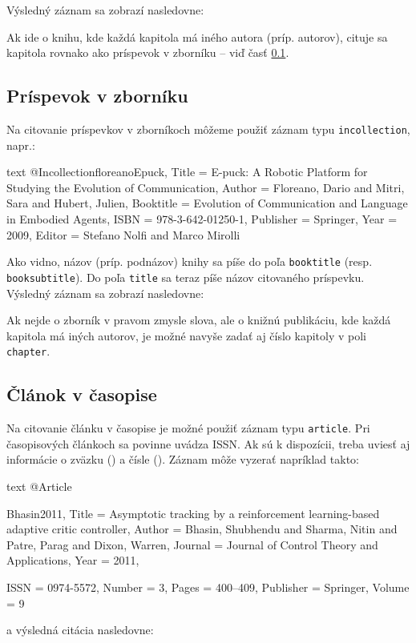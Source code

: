 Výsledný záznam sa zobrazí nasledovne:

\noindent[X] 

Ak ide o knihu, kde každá kapitola má iného autora (príp. autorov), cituje sa kapitola rovnako ako príspevok v zborníku -- viď časť \ref{sec:inproc}.

\subsection{Príspevok v zborníku}
\label{sec:inproc}

Na citovanie príspevkov v zborníkoch môžeme použiť záznam typu \texttt{incollection}, napr.:
\begin{inlinecode}{text}
@Incollection{floreanoEpuck,
  Title                    = {E-puck: A Robotic Platform for Studying the Evolution of Communication},
  Author                   = {Floreano, Dario and Mitri, Sara and Hubert, Julien},
  Booktitle                = {Evolution of Communication and Language in Embodied Agents},
  ISBN                     = {978-3-642-01250-1},
  Publisher                = {Springer},
  Year                     = {2009},
  Editor                   = {Stefano Nolfi and Marco Mirolli}
}
\end{inlinecode}

Ako vidno, názov (príp. podnázov) knihy sa píše do poľa \texttt{booktitle} (resp. \texttt{booksubtitle}). Do poľa \texttt{title} sa teraz píše názov citovaného príspevku. Výsledný záznam sa zobrazí nasledovne:

\noindent[X] 

Ak nejde o zborník v pravom zmysle slova, ale o knižnú publikáciu, kde každá kapitola má iných autorov, je možné navyše zadať aj číslo kapitoly v poli \texttt{chapter}.

\subsection{Článok v časopise}

Na citovanie článku v časopise je možné použiť záznam typu \texttt{article}. Pri časopisových článkoch sa povinne uvádza ISSN. Ak sú k dispozícii, treba uviesť aj informácie o zväzku () a čísle (). Záznam môže vyzerať napríklad takto:
\begin{inlinecode}{text}
@Article{Bhasin2011,
  Title                    = {Asymptotic tracking by a reinforcement learning-based adaptive critic controller},
  Author                   = {Bhasin, Shubhendu and Sharma, Nitin and Patre, Parag and Dixon, Warren},
  Journal                  = {Journal of Control Theory and Applications},
  Year                     = {2011},

  ISSN                     = {0974-5572},
  Number                   = {3},
  Pages                    = {400--409},
  Publisher                = {Springer},
  Volume                   = {9}
}
\end{inlinecode}
a výsledná citácia nasledovne:

